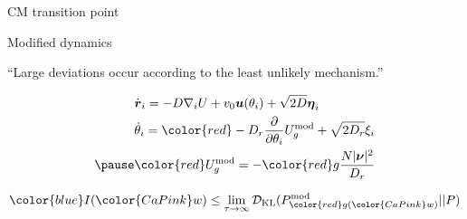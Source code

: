 \documentclass{beamer}
\begin{document}
\begin{frame}{CM transition point}


\end{frame}

\begin{frame}{Modified dynamics}


\begin{center}
``Large deviations occur according to the least unlikely mechanism.''
\end{center}

\pause
\begin{eqnarray}
&\dot{\boldsymbol{r}}_i = - D \nabla_i U + v_0 \boldsymbol{u}(\theta_i) + \sqrt{2 D} \boldsymbol{\eta}_i\\
&\dot{\theta}_i = {\color{red}- D_r \frac{\partial}{\partial \theta_i} U^{\rm mod}_g} + \sqrt{2 D_r} \xi_i\\ \pause
&{\color{red} U_g^{\rm mod}} = - {\color{red} g} \frac{N |\boldsymbol{\nu}|^2}{D_r}
\end{eqnarray}

\pause

\begin{equation}
{\color{blue} I}({\color{CaPink} w}) \leq \lim_{\tau \to \infty} \mathcal{D}_{\rm KL}(P^{\rm mod}_{{\color{red} g}({\color{CaPink} w})} || P)
\end{equation}

\end{frame}
\end{document}
